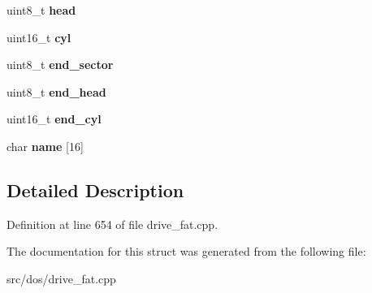 \begin{DoxyCompactItemize}
\item 
\hypertarget{struct__PC98RawPartition_a159d590fdf1918ef8ba4fa37ffbb896d}{uint8\-\_\-t {\bfseries head}}\label{struct__PC98RawPartition_a159d590fdf1918ef8ba4fa37ffbb896d}

\item 
\hypertarget{struct__PC98RawPartition_ac1a8dc3e314587ea5bceb09b1d960643}{uint16\-\_\-t {\bfseries cyl}}\label{struct__PC98RawPartition_ac1a8dc3e314587ea5bceb09b1d960643}

\item 
\hypertarget{struct__PC98RawPartition_ae9213f512993e8dd4fdbe2409ef3a402}{uint8\-\_\-t {\bfseries end\-\_\-sector}}\label{struct__PC98RawPartition_ae9213f512993e8dd4fdbe2409ef3a402}

\item 
\hypertarget{struct__PC98RawPartition_ad005cde8a52522ccc7efc9e7aa97db80}{uint8\-\_\-t {\bfseries end\-\_\-head}}\label{struct__PC98RawPartition_ad005cde8a52522ccc7efc9e7aa97db80}

\item 
\hypertarget{struct__PC98RawPartition_a23df046ffa51a15203ef87662debd38b}{uint16\-\_\-t {\bfseries end\-\_\-cyl}}\label{struct__PC98RawPartition_a23df046ffa51a15203ef87662debd38b}

\item 
\hypertarget{struct__PC98RawPartition_ac3401e613d79b53415085b2a53c34fab}{char {\bfseries name} \mbox{[}16\mbox{]}}\label{struct__PC98RawPartition_ac3401e613d79b53415085b2a53c34fab}

\end{DoxyCompactItemize}


\subsection{Detailed Description}


Definition at line 654 of file drive\-\_\-fat.\-cpp.



The documentation for this struct was generated from the following file\-:\begin{DoxyCompactItemize}
\item 
src/dos/drive\-\_\-fat.\-cpp\end{DoxyCompactItemize}

